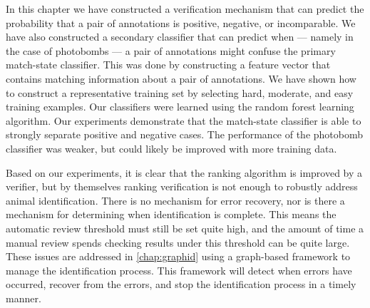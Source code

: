     In this chapter we have constructed a verification mechanism that can predict the probability that a pair of
      annotations is positive, negative, or incomparable.
    We have also constructed a secondary classifier that can predict when --- namely in the case of photobombs
      --- a pair of annotations might confuse the primary match-state classifier.
    This was done by constructing a feature vector that contains matching information about a pair of
      annotations.
    We have shown how to construct a representative training set by selecting hard, moderate, and easy training
      examples.
    Our classifiers were learned using the random forest learning algorithm.
    Our experiments demonstrate that the match-state classifier is able to strongly separate positive and
      negative cases.
    The performance of the photobomb classifier was weaker, but could likely be improved with more training data.

    Based on our experiments, it is clear that the ranking algorithm is improved by a verifier, but by themselves
      ranking verification is not enough to robustly address animal identification.
    There is no mechanism for error recovery, nor is there a mechanism for determining when identification is
      complete.
    This means the automatic review threshold must still be set quite high, and the amount of time a manual
      review spends checking results under this threshold can be quite large.
    These issues are addressed in \cref{chap:graphid} using a graph-based framework to manage the identification
      process.
    This framework will detect when errors have occurred, recover from the errors, and stop the identification
      process in a timely manner.





